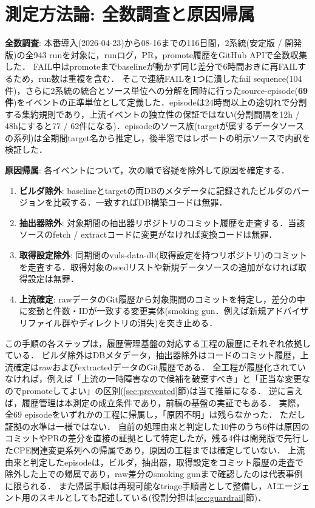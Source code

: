 \documentclass{css}
\begin{document}
\section{測定方法論: 全数調査と原因帰属}
\label{sec:method}

\textbf{全数調査}:
本番導入(2026-04-23)から08-16までの116日間，2系統(安定版 / 開発版)の全943 runを対象に，runログ，PR，promote履歴をGitHub APIで全数収集した．
FAIL中はpromoteまでbaselineが動かず同じ差分で6時間おきに再FAILするため，run数は重複を含む．
そこで連続FAILを1つに潰したfail sequence(104件)，さらに2系統の統合とソース単位への分解を同時に行ったsource-episode(\textbf{69件})をイベントの正準単位として定義した．episodeは24時間以上の途切れで分割する集約規則であり，上流イベントの独立性の保証ではない(分割間隔を12h / 48hにすると77 / 62件になる)．episodeのソース族(targetが属するデータソースの系列)は全期間target名から推定し，後半窓ではレポートの明示ソースで内訳を検証した．

\textbf{原因帰属}:
各イベントについて，次の順で容疑を除外して原因を確定する．

\begin{enumerate}
\item \textbf{ビルダ除外}: baselineとtargetの両DBのメタデータに記録されたビルダのバージョンを比較する．一致すればDB構築コードは無罪．
\item \textbf{抽出器除外}: 対象期間の抽出器リポジトリのコミット履歴を走査する．当該ソースのfetch / extractコードに変更がなければ変換コードは無罪．
\item \textbf{取得設定除外}: 同期間のvuls-data-db(取得設定を持つリポジトリ)のコミットを走査する．取得対象のseedリストや新規データソースの追加がなければ取得設定は無罪．
\item \textbf{上流確定}: rawデータのGit履歴から対象期間のコミットを特定し，差分の中に変動と件数・IDが一致する変更実体(smoking gun．例えば新規アドバイザリファイル群やディレクトリの消失)を突き止める．
\end{enumerate}

この手順の各ステップは，履歴管理基盤\cite{nakaoka2025}の対応する工程の履歴にそれぞれ依拠している．
ビルダ除外はDBメタデータ，抽出器除外はコードのコミット履歴，上流確定はrawおよびextractedデータのGit履歴である．
全工程が履歴化されていなければ，例えば「上流の一時障害なので候補を破棄すべき」と「正当な変更なのでpromoteしてよい」の区別(\ref{sec:prevented}節)は当て推量になる．
逆に言えば，履歴管理は本測定の成立条件であり，前稿の基盤の実証でもある．
実際，全69 episodeをいずれかの工程に帰属し，「原因不明」は残らなかった．
ただし証拠の水準は一様ではない．
自前の処理由来と判定した10件のうち6件は原因のコミットやPRの差分を直接の証拠として特定したが，残る4件は開発版で先行したCPE関連変更系列への帰属であり，原因の工程までは確定していない．
上流由来と判定したepisodeは，ビルダ，抽出器，取得設定をコミット履歴の走査で除外した上での帰属であり，raw差分のsmoking gunまで確認したのは代表事例に限られる．
また帰属手順は再現可能なtriage手順書として整備し，AIエージェント用のスキルとしても記述している(役割分担は\ref{sec:guardrail}節)．
\end{document}
